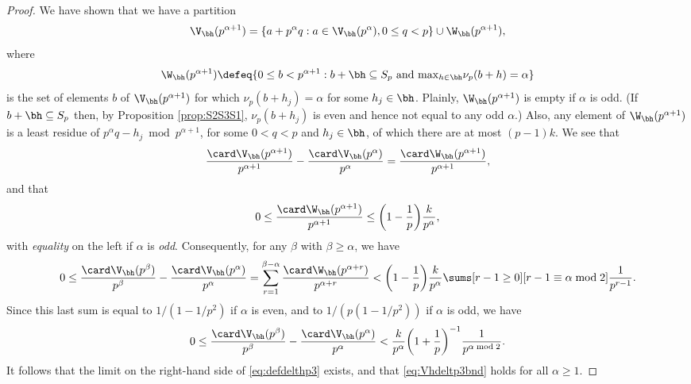 \documentclass[12pt, reqno, twoside, letterpaper]{amsart}
\begin{document}
\begin{proof}
We have shown that we have a partition
\[
  \V_{\bh}(p^{\alpha + 1})
   = 
    \{a + p^{\alpha}q : a \in \V_{\bh}(p^{\alpha}), 0 \le q < p\}
     \cup 
      \W_{\bh}(p^{\alpha + 1}),
\]
where
\[
 \W_{\bh}(p^{\alpha + 1}) 
  \defeq 
   \{0 \le b < p^{\alpha + 1} : b + \bh \subseteq S_p 
        \,\, \hbox{\textup{and}} \,\, 
         {\textstyle \max_{h \in\bh} } \nu_p(b + h) = \alpha\} 
\]
is the set of elements $b$ of $\V_{\bh}(p^{\alpha + 1})$ for which 
$\nu_p(b + h_j) = \alpha$ for some $h_j \in \bh$.
%
Plainly, $\W_{\bh}(p^{\alpha + 1})$ is empty if $\alpha$ is odd.
%
(If $b + \bh \subseteq S_p$ then, by 
Proposition \ref{prop:S2S3S1}, $\nu_p(b + h_j)$ is even and hence 
not equal to any odd $\alpha$.)
%
Also, any element of $\W_{\bh}(p^{\alpha + 1})$ is a least residue 
of $p^{\alpha}q - h_j \bmod p^{\alpha + 1}$, for some 
$0 < q < p$ and $h_j \in \bh$, of which there are at most 
$(p - 1)k$.
%
We see that 
\begin{equation}
 \label{eq:VW}
 \frac{\card \V_{\bh}(p^{\alpha + 1})}{p^{\alpha + 1}}
  -
   \frac{\card \V_{\bh}(p^{\alpha})}{p^{\alpha}}
    =
     \frac{\card \W_{\bh}(p^{\alpha + 1})}{p^{\alpha + 1}},
\end{equation}
and that 
\begin{equation}
 \label{eq:VWb}
 0 
  \le 
   \frac{\card \W_{\bh}(p^{\alpha + 1})}{p^{\alpha + 1}}
    \le 
     \bigg(1 - \frac{1}{p}\bigg)\frac{k}{p^{\alpha}},
\end{equation}
with {\em equality} on the left if $\alpha$ is {\em odd}.
%
Consequently, for any $\beta$ with $\beta \ge \alpha$, we have 
\begin{align*}
 0
 \le
  \frac{\card \V_{\bh}(p^{\beta})}{p^{\beta}}
   -
    \frac{\card \V_{\bh}(p^{\alpha})}{p^{\alpha}}
 =
  \sum_{r = 1}^{\beta - \alpha}
   \frac{\card \W_{\bh}(p^{\alpha + r})}{p^{\alpha + r}}
    <
     \bigg(1 - \frac{1}{p}\bigg)\frac{k}{p^{\alpha}} 
      \sums[r - 1 \ge 0][r - 1 \equiv \alpha \bmod 2]
       \frac{1}{p^{r - 1}}.
\end{align*}
%
Since this last sum is equal to $1/(1 - 1/p^2)$ if $\alpha$ is 
even, and to $1/(p(1 - 1/p^2))$ if $\alpha$ is odd, we have 
\[
  0
   \le
    \frac{\card \V_{\bh}(p^{\beta})}{p^{\beta}} 
   - \frac{\card \V_{\bh}(p^{\alpha})}{p^{\alpha}}
      <
       \frac{k}{p^{\alpha}}
        \bigg(1 + \frac{1}{p}\bigg)^{-1}
         \frac{1}{p^{\alpha \bmod 2}}.
\]
%
It follows that the limit on the right-hand side of 
\eqref{eq:defdelthp3} exists, and that \eqref{eq:Vhdeltp3bnd} 
holds for all $\alpha \ge 1$.


\end{proof}
\end{document}
